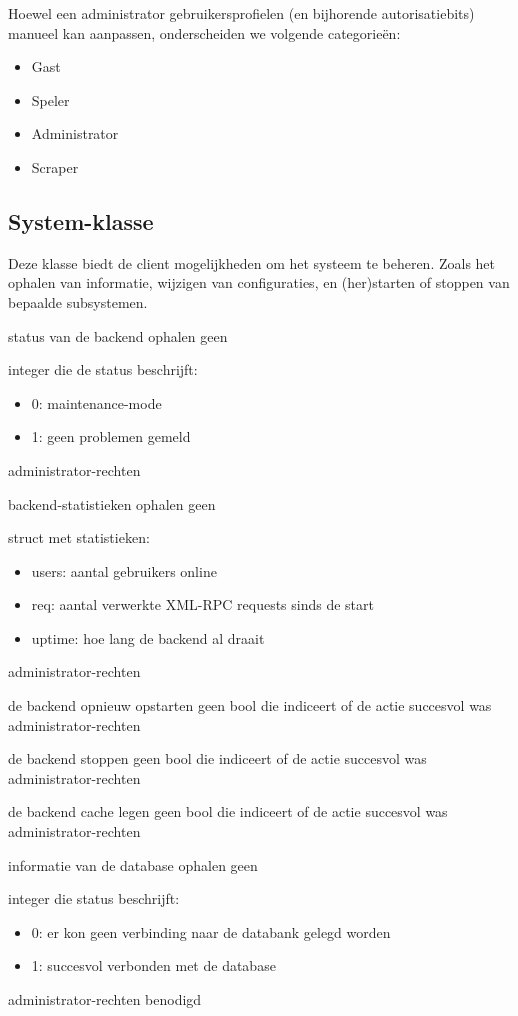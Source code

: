 Hoewel een administrator gebruikersprofielen (en bijhorende autorisatiebits) manueel kan aanpassen, onderscheiden we volgende categorie\"en:
\begin{itemize}
\item{Gast}
\item{Speler}
\item{Administrator}
\item{Scraper}
\end{itemize}

\subsection{System-klasse}

Deze klasse biedt de client mogelijkheden om het systeem te beheren. Zoals het ophalen van informatie, wijzigen van configuraties, en (her)starten of stoppen van bepaalde subsystemen.

	{ status van de backend ophalen }
	{ geen }
	{ integer die de status beschrijft:
		\begin{itemize}
		\item{0: maintenance-mode}
		\item{1: geen problemen gemeld}
		\end{itemize} }
	{ administrator-rechten }

	{ backend-statistieken ophalen }
	{ geen }
	{ struct met statistieken:
		\begin{itemize}
		\item{users: aantal gebruikers online}
		\item{req: aantal verwerkte XML-RPC requests sinds de start}
		\item{uptime: hoe lang de backend al draait}
		\end{itemize} }
	{ administrator-rechten }

	{ de backend opnieuw opstarten }
	{ geen }
	{ bool die indiceert of de actie succesvol was }
	{ administrator-rechten }

	{ de backend stoppen }
	{ geen }
	{ bool die indiceert of de actie succesvol was }
	{ administrator-rechten }

	{ de backend cache legen }
	{ geen }
	{ bool die indiceert of de actie succesvol was }
	{ administrator-rechten }

	{ informatie van de database ophalen }
	{ geen }
	{ integer die status beschrijft:
		\begin{itemize}
		\item{0: er kon geen verbinding naar de databank gelegd worden}
		\item{1: succesvol verbonden met de database}
		\end{itemize} }
	{ administrator-rechten benodigd}


